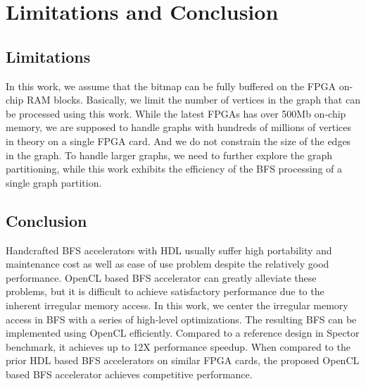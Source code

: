 \section{Limitations and Conclusion} \label{sec:conclusion}
\subsection{Limitations}

In this work, we assume that the bitmap can be fully buffered on the FPGA on-chip RAM blocks. 
Basically, we limit the number of vertices in the graph that 
can be processed using this work. While the latest FPGAs has over 
500Mb on-chip memory, we are supposed to handle graphs with hundreds 
of millions of vertices in theory on a single FPGA card. 
And we do not constrain the size of the edges in the graph. 
To handle larger graphs, we need to further explore 
the graph partitioning, while this work exhibits 
the efficiency of the BFS processing of a single graph partition.

\subsection{Conclusion}
Handcrafted BFS accelerators with HDL usually suffer high portability and maintenance cost 
as well as ease of use problem despite the relatively 
good performance. OpenCL based BFS accelerator can greatly alleviate these problems, but it is 
difficult to achieve satisfactory performance due to the inherent irregular memory access. 
In this work, we center the irregular memory access in BFS with  
a series of high-level optimizations. The resulting BFS can be implemented using OpenCL efficiently.
Compared to a reference design in Spector benchmark, it achieves up to 12X performance speedup.
When compared to the prior HDL based BFS accelerators on similar FPGA cards, 
the proposed OpenCL based BFS accelerator achieves competitive performance.



